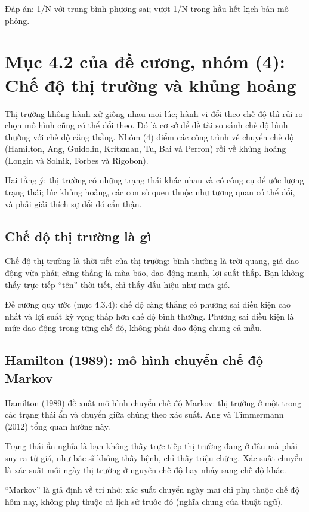 Đáp án: 1/N với trung bình-phương sai; vượt 1/N trong hầu hết kịch bản mô phỏng.

\chapter{Mục 4.2 của đề cương, nhóm (4): Chế độ thị trường và khủng hoảng}

Thị trường không hành xử giống nhau mọi lúc; hành vi đổi theo chế độ thì rủi ro chọn mô hình cũng có thể đổi theo. Đó là cơ sở để đề tài so sánh chế độ bình thường với chế độ căng thẳng. Nhóm (4) điểm các công trình về chuyển chế độ (Hamilton, Ang, Guidolin, Kritzman, Tu, Bai và Perron) rồi về khủng hoảng (Longin và Solnik, Forbes và Rigobon).

Hai tầng ý: thị trường có những trạng thái khác nhau và có công cụ để ước lượng trạng thái; lúc khủng hoảng, các con số quen thuộc như tương quan có thể đổi, và phải giải thích sự đổi đó cẩn thận.

\section{Chế độ thị trường là gì}

Chế độ thị trường là thời tiết của thị trường: bình thường là trời quang, giá dao động vừa phải; căng thẳng là mùa bão, dao động mạnh, lợi suất thấp. Bạn không thấy trực tiếp “tên” thời tiết, chỉ thấy dấu hiệu như mưa gió.

Đề cương quy ước (mục 4.3.4): chế độ căng thẳng có phương sai điều kiện cao nhất và lợi suất kỳ vọng thấp hơn chế độ bình thường. Phương sai điều kiện là mức dao động trong từng chế độ, không phải dao động chung cả mẫu.

\section{Hamilton (1989): mô hình chuyển chế độ Markov}

Hamilton (1989) đề xuất mô hình chuyển chế độ Markov: thị trường ở một trong các trạng thái ẩn và chuyển giữa chúng theo xác suất. Ang và Timmermann (2012) tổng quan hướng này.

Trạng thái ẩn nghĩa là bạn không thấy trực tiếp thị trường đang ở đâu mà phải suy ra từ giá, như bác sĩ không thấy bệnh, chỉ thấy triệu chứng. Xác suất chuyển là xác suất mỗi ngày thị trường ở nguyên chế độ hay nhảy sang chế độ khác.

“Markov” là giả định về trí nhớ: xác suất chuyển ngày mai chỉ phụ thuộc chế độ hôm nay, không phụ thuộc cả lịch sử trước đó (nghĩa chung của thuật ngữ).

